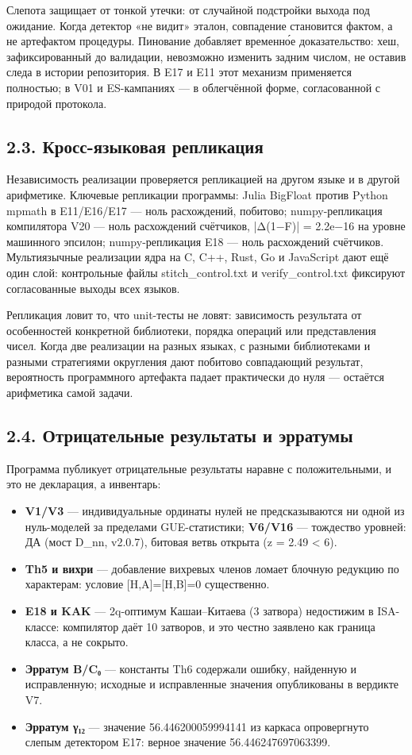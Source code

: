 \documentclass[11pt,a4paper]{article}
\begin{document}
Слепота защищает от тонкой утечки: от случайной подстройки выхода под ожидание. Когда детектор «не видит» эталон, совпадение становится фактом, а не артефактом процедуры. Пинование добавляет временно́е доказательство: хеш, зафиксированный до валидации, невозможно изменить задним числом, не оставив следа в истории репозитория. В E17 и E11 этот механизм применяется полностью; в V01 и ES-кампаниях — в облегчённой форме, согласованной с природой протокола.

\subsection{2.3. Кросс-языковая репликация}

Независимость реализации проверяется репликацией на другом языке и в другой арифметике. Ключевые репликации программы: Julia BigFloat против Python mpmath в E11/E16/E17 — ноль расхождений, побитово; numpy-репликация компилятора V20 — ноль расхождений счётчиков, |Δ(1−F)| = 2.2e−16 на уровне машинного эпсилон; numpy-репликация E18 — ноль расхождений счётчиков. Мультиязычные реализации ядра на C, C++, Rust, Go и JavaScript дают ещё один слой: контрольные файлы stitch\_control.txt и verify\_control.txt фиксируют согласованные выходы всех языков.

Репликация ловит то, что unit-тесты не ловят: зависимость результата от особенностей конкретной библиотеки, порядка операций или представления чисел. Когда две реализации на разных языках, с разными библиотеками и разными стратегиями округления дают побитово совпадающий результат, вероятность программного артефакта падает практически до нуля — остаётся арифметика самой задачи.

\subsection{2.4. Отрицательные результаты и эрратумы}

Программа публикует отрицательные результаты наравне с положительными, и это не декларация, а инвентарь:

\begin{itemize}
  \item \textbf{V1/V3} — индивидуальные ординаты нулей не предсказываются ни одной из нуль-моделей за пределами GUE-статистики; \textbf{V6/V16} — тождество уровней: ДА (мост D\_nn, v2.0.7), битовая ветвь открыта (z = 2.49 < 6).
  \item \textbf{Th5 и вихри} — добавление вихревых членов ломает блочную редукцию по характерам: условие [H,A]=[H,B]=0 существенно.
  \item \textbf{E18 и KAK} — 2q-оптимум Кашаи–Китаева (3 затвора) недостижим в ISA-классе: компилятор даёт 10 затворов, и это честно заявлено как граница класса, а не сокрыто.
  \item \textbf{Эрратум B/C₀} — константы Th6 содержали ошибку, найденную и исправленную; исходные и исправленные значения опубликованы в вердикте V7.
  \item \textbf{Эрратум γ₁₂} — значение 56.446200059994141 из каркаса опровергнуто слепым детектором E17: верное значение 56.446247697063399.
\end{itemize}
\end{document}
